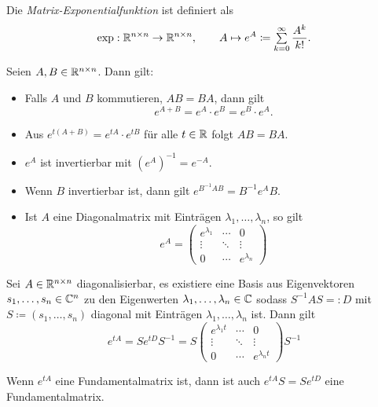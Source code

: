 \documentclass{cheat-sheet}
\begin{document}

\begin{defn}
  Die \emph{Matrix-Exponentialfunktion} ist definiert als
  \[ \exp : \R^{n \times n} \to \R^{n \times n}, \qquad A \mapsto e^A \coloneqq \sum_{k=0}^\infty \frac{A^k}{k!}. \]
\end{defn}

\begin{satz}
  Seien $A, B \in \mathbb{R}^{n \times n}$. Dann gilt:
  \begin{itemize}
    \item Falls $A$ und $B$ kommutieren, \dh{} $AB = BA$, dann gilt
    \[ e^{A+B} = e^A \cdot e^B = e^B \cdot e^A. \]
    \item Aus $e^{t(A + B)} = e^{tA} \cdot e^{tB}$ für alle $t \in \mathbb{R}$ folgt $AB = BA$.
    \item $e^{A}$ ist invertierbar mit $(e^A)^{-1} = e^{-A}$.
    \item Wenn $B$ invertierbar ist, dann gilt $e^{B^{-1}AB} = B^{-1} e^A B$.
    \item Ist $A$ eine Diagonalmatrix mit Einträgen $\lambda_1, \ldots, \lambda_n$, so gilt
    \[ e^A = \begin{pmatrix} e^{\lambda_1} & \cdots & 0 \\ \vdots & \ddots & \vdots \\ 0 & \cdots & e^{\lambda_n} \end{pmatrix} \]
  \end{itemize}
\end{satz}

\begin{satz}
  Sei $A \in \mathbb{R}^{n \times n}$ diagonalisierbar, \dh{} es existiere eine Basis aus Eigenvektoren $s_1, \ldots, s_n \in \mathbb{C}^n$ zu den Eigenwerten $\lambda_1, \ldots, \lambda_n \in \mathbb{C}$ sodass $S^{-1} A S =: D$ mit $S \coloneqq (s_1, \ldots, s_n)$ diagonal mit Einträgen $\lambda_1, \ldots, \lambda_n$ ist. Dann gilt
  \[ e^{tA} = S e^{tD} S^{-1} = S \begin{pmatrix} e^{\lambda_1 t} & \cdots & 0 \\ \vdots & \ddots & \vdots \\ 0 & \cdots & e^{\lambda_n t} \end{pmatrix} S^{-1} \]
\end{satz}

\begin{bem}
  Wenn $e^{tA}$ eine Fundamentalmatrix ist, dann ist auch $e^{tA} S = S e^{tD}$ eine Fundamentalmatrix.
\end{bem}
\end{document}
